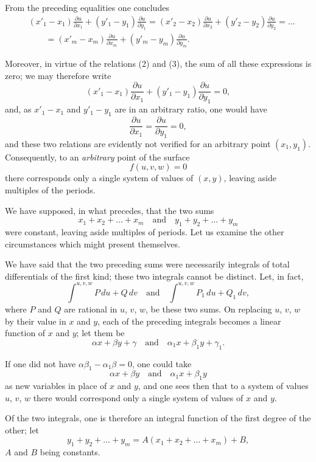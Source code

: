 \documentclass{article}
\begin{document}
From the preceding equalities one concludes
\[
\begin{aligned}
&(x'_{1} - x_{1})\frac{\partial u}{\partial x_{1}} + (y'_{1} - y_{1})\frac{\partial u}{\partial y_{1}} = (x'_{2} - x_{2})\frac{\partial u}{\partial x_{2}} + (y'_{2} - y_{2})\frac{\partial u}{\partial y_{2}} = \ldots \\
&\qquad = (x'_{m} - x_{m})\frac{\partial u}{\partial x_{m}} + (y'_{m} - y_{m})\frac{\partial u}{\partial y_{m}}.
\end{aligned}
\]

Moreover, in virtue of the relations (2) and (3), the sum of all these expressions is zero; we may therefore write
\[
(x'_{1} - x_{1})\frac{\partial u}{\partial x_{1}} + (y'_{1} - y_{1})\frac{\partial u}{\partial y_{1}} = 0,
\]
and, as $x'_{1} - x_{1}$ and $y'_{1} - y_{1}$ are in an arbitrary ratio, one would have
\[
\frac{\partial u}{\partial x_{1}} = \frac{\partial u}{\partial y_{1}} = 0,
\]
and these two relations are evidently not verified for an arbitrary point $(x_{1}, y_{1})$. Consequently, to an \emph{arbitrary} point of the surface
\[
f(u, v, w) = 0
\]
there corresponds only a single system of values of $(x, y)$, leaving aside multiples of the periods.

We have supposed, in what precedes, that the two sums
\[
x_{1} + x_{2} + \ldots + x_{m} \quad \text{and} \quad y_{1} + y_{2} + \ldots + y_{m}
\]
were constant, leaving aside multiples of periods. Let us examine the other circumstances which might present themselves.

We have said that the two preceding sums were necessarily integrals of total differentials of the first kind; these two integrals cannot be distinct. Let, in fact,
\[
\int^{u, v, w} P\,du + Q\,dv \quad \text{and} \quad \int^{u, v, w} P_{1}\,du + Q_{1}\,dv,
\]
where $P$ and $Q$ are rational in $u$, $v$, $w$, be these two sums. On replacing $u$, $v$, $w$ by their value in $x$ and $y$, each of the preceding integrals becomes a linear function of $x$ and $y$; let them be
\[
\alpha x + \beta y + \gamma \quad \text{and} \quad \alpha_{1}x + \beta_{1}y + \gamma_{1}.
\]

If one did not have $\alpha\beta_{1} - \alpha_{1}\beta = 0$, one could take
\[
\alpha x + \beta y \quad \text{and} \quad \alpha_{1}x + \beta_{1}y
\]
as new variables in place of $x$ and $y$, and one sees then that to a system of values $u$, $v$, $w$ there would correspond only a single system of values of $x$ and $y$.

Of the two integrals, one is therefore an integral function of the first degree of the other; let
\[
y_{1} + y_{2} + \ldots + y_{m} = A(x_{1} + x_{2} + \ldots + x_{m}) + B,
\]
$A$ and $B$ being constants.
\end{document}
